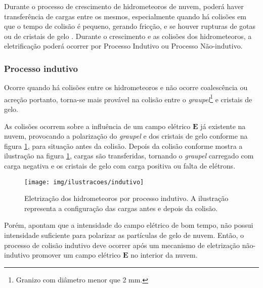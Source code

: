 
Durante o processo de crescimento de hidrometeoros de nuvem, poderá haver transferência de cargas entre os mesmos, especialmente quando há colisões em que o tempo de colisão é pequeno, gerando fricção, e se houver rupturas de gotas ou de cristais de gelo \cite{Lenard1892, reynolds1957, matthews1964, jonas1968, simpson1909}. Durante o crescimento e as colisões dos hidrometeoros, a eletrificação poderá ocorrer por Processo Indutivo ou Processo Não-indutivo.


\subsubsection{Processo indutivo} 

Ocorre quando há colisões entre os hidrometeoros e não ocorre coalescência ou acreção portanto, torna-se mais provável na colisão entre o \textit{graupel}\footnote{Granizo com diâmetro menor que 2 mm.} e cristais de gelo.

As colisões ocorrem sobre a influência de um campo elétrico $\mathbf{E}$ já existente na nuvem, provocando a polarização do \textit{graupel} e dos cristais de gelo conforme na figura \ref{fig:ind}, para situação antes da colisão. Depois da colisão conforme mostra a ilustração na figura \ref{fig:ind}, cargas são transferidas, tornando o \textit{graupel} carregado com carga negativa e os cristais de gelo com carga positiva ou falta de elétrons.

\begin{figure}[ht]
   \centering
   \texttt{[image: img/ilustracoes/indutivo]}
   \caption{Eletrização dos hidrometeoros por processo indutivo. A ilustração representa a configuração das cargas antes e depois da colisão.}
   \label{fig:ind}
\end{figure}

Porém,  apontam que a intensidade do campo elétrico de bom tempo, não possui intensidade suficiente para polarizar as partículas de gelo de nuvem. Então, o processo de colisão indutivo deve ocorrer após um mecanismo de eletrização não-indutivo promover um campo elétrico $\mathbf{E}$ no interior da nuvem. 

